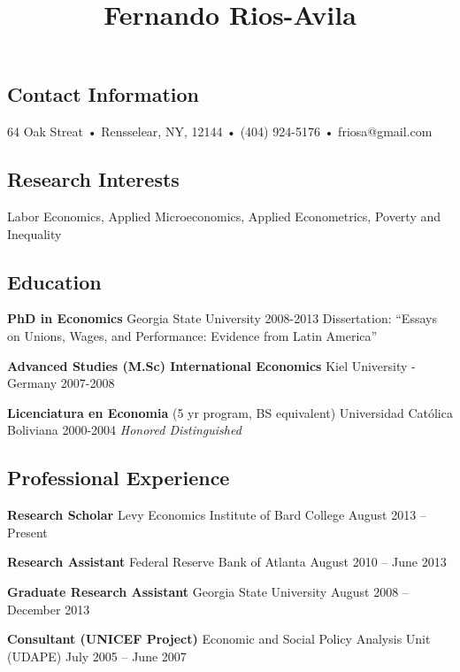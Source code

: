 \documentclass[
  letterpaper,
]{moderncv}
\title{Fernando Rios-Avila}
\author{}
\date{}
\begin{document}
\maketitle

\subsection{Contact Information}\label{contact-information}

64 Oak Streat • Rensselear, NY, 12144 • (404) 924-5176 •
friosa@gmail.com

\subsection{Research Interests}\label{research-interests}

Labor Economics, Applied Microeconomics, Applied Econometrics, Poverty
and Inequality

\subsection{Education}\label{education}

\textbf{PhD in Economics} \textbar{} Georgia State University \textbar{}
2008-2013 Dissertation: ``Essays on Unions, Wages, and Performance:
Evidence from Latin America''

\textbf{Advanced Studies (M.Sc) International Economics} \textbar{} Kiel
University - Germany \textbar{} 2007-2008

\textbf{Licenciatura en Economia} (5 yr program, BS equivalent)
\textbar{} Universidad Católica Boliviana \textbar{} 2000-2004
\emph{Honored Distinguished}

\subsection{Professional Experience}\label{professional-experience}

\textbf{Research Scholar} \textbar{} Levy Economics Institute of Bard
College \textbar{} August 2013 -- Present

\textbf{Research Assistant} \textbar{} Federal Reserve Bank of Atlanta
\textbar{} August 2010 -- June 2013

\textbf{Graduate Research Assistant} \textbar{} Georgia State University
\textbar{} August 2008 -- December 2013

\textbf{Consultant (UNICEF Project)} \textbar{} Economic and Social
Policy Analysis Unit (UDAPE) \textbar{} July 2005 -- June 2007
\end{document}

